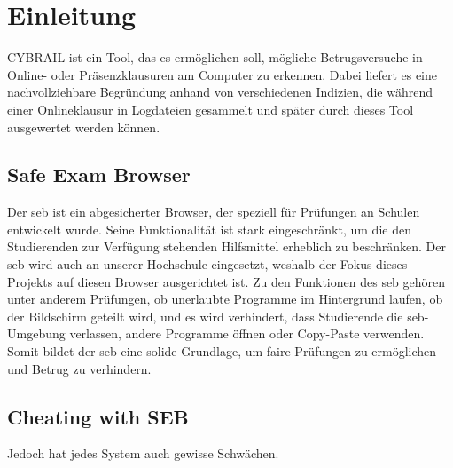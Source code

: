 \chapter{Einleitung} \label{ch:einleitung}
CYBRAIL ist ein Tool, das es ermöglichen soll, mögliche Betrugsversuche in Online- oder Präsenzklausuren am Computer zu erkennen. 
Dabei liefert es eine nachvollziehbare Begründung anhand von verschiedenen Indizien, die während einer Onlineklausur in Logdateien gesammelt und später durch dieses Tool ausgewertet werden können.

\section{Safe Exam Browser}
Der \gls{seb} ist ein abgesicherter Browser, der speziell für Prüfungen an Schulen entwickelt wurde. 
Seine Funktionalität ist stark eingeschränkt, um die den Studierenden zur Verfügung stehenden Hilfsmittel erheblich zu beschränken.
Der \gls{seb} wird auch an unserer Hochschule eingesetzt, weshalb der Fokus dieses Projekts auf diesen Browser ausgerichtet ist. 
Zu den Funktionen des \gls{seb} gehören unter anderem Prüfungen, ob unerlaubte Programme im Hintergrund laufen, ob der Bildschirm geteilt wird, und es wird verhindert, dass Studierende die \gls{seb}-Umgebung verlassen, andere Programme öffnen oder Copy-Paste verwenden. 
Somit bildet der \gls{seb} eine solide Grundlage, um faire Prüfungen zu ermöglichen und Betrug zu verhindern.
\section{Cheating with SEB}
Jedoch hat jedes System auch gewisse Schwächen.

